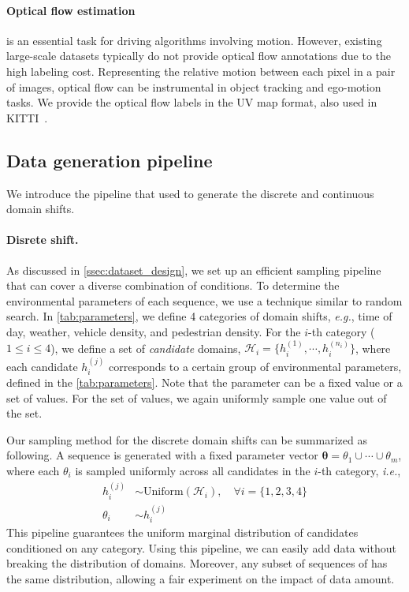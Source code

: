 \paragraph{Optical flow estimation} is an essential task for driving algorithms involving motion. However, existing large-scale datasets typically do not provide optical flow annotations due to the high labeling cost. Representing the relative motion between each pixel in a pair of images, optical flow can be instrumental in object tracking and ego-motion tasks. 
We provide the optical flow labels in the UV map format, also used in KITTI~\cite{geiger2013vision}.

\subsection{Data generation pipeline} \label{ssec:dataset_generation}

We introduce the pipeline that used to generate the discrete and continuous domain shifts.

\paragraph{Disrete shift.}
As discussed in \autoref{ssec:dataset_design}, we set up an efficient sampling pipeline that can cover a diverse combination of conditions. To determine the environmental parameters of each sequence, we use a technique similar to random search. In \autoref{tab:parameters}, we define 4 categories of domain shifts, \textit{e.g.}, time of day, weather, vehicle density, and pedestrian density. For the $i$-th category ($1\leq i \leq 4$), we define a 
set of \textit{candidate} domains, $\mathcal{H}_{i} = \{h_i^{(1)}, \cdots , h_i^{(n_i)} \}$, where each candidate $h_i^{(j)}$ corresponds to a certain group of environmental parameters, defined in the \autoref{tab:parameters}. Note that the parameter can be a fixed value or a set of values. For the set of values, we again uniformly sample one value out of the set. 

Our sampling method for the discrete domain shifts can be summarized as following. A sequence is generated with a fixed parameter vector $\bm{\theta} = \theta_1 \cup \cdots \cup \theta_m$, where each $\theta_i$ is sampled uniformly across all candidates in the $i$-th category, \textit{i.e.},
\begin{align}
    h_i^{(j)} & \sim \mathrm{Uniform}(\mathcal{H}_{i}), \quad \forall i = \{1,2,3,4\} \\
    \theta_i & \sim h_i^{(j)}
\end{align}
This pipeline guarantees the uniform marginal distribution of candidates conditioned on any category. Using this pipeline, we can easily add data without breaking the distribution of domains. Moreover, any subset of sequences of \thedataset{} has the same distribution, allowing a fair experiment on the impact of data amount.


